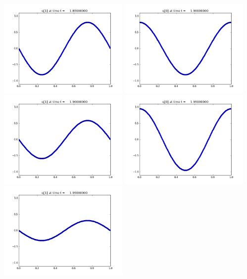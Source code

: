 \documentclass[11pt]{article}
\begin{document}
\includegraphics[width=0.475\textwidth]{frame0037fig1.png}
\vskip 10pt 
\includegraphics[width=0.475\textwidth]{frame0038fig0.png}
\includegraphics[width=0.475\textwidth]{frame0038fig1.png}
\vskip 10pt 
\includegraphics[width=0.475\textwidth]{frame0039fig0.png}
\includegraphics[width=0.475\textwidth]{frame0039fig1.png}
\end{document}
